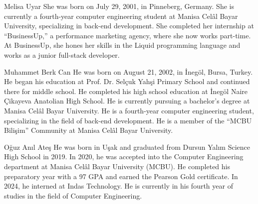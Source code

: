\documentclass[twoside,a4paper,journal]{IEEEtran}
\begin{document}
\begin{IEEEbiography}{Melisa Uyar}
She was born on July 29, 2001, in Pinneberg, Germany.
She is currently a fourth-year computer engineering student at Manisa Celâl
Bayar University, specializing in back-end development.
She completed her internship at ``BusinessUp,'' a performance marketing agency,
where she now works part-time.
At BusinessUp, she hones her skills in the Liquid programming language and
works as a junior full-stack developer.
\end{IEEEbiography}

\begin{IEEEbiography}{Muhammet Berk Can}
He was born on August 21, 2002, in İnegöl, Bursa, Turkey.
He began his education at Prof. Dr. Selçuk Yahşi Primary School and continued
there for middle school.
He completed his high school education at İnegöl Naire Çikayeva Anatolian High
School.
He is currently pursuing a bachelor's degree at Manisa Celâl Bayar University.
He is a fourth-year computer engineering student, specializing in the field of
back-end development.
He is a member of the ``MCBU Bilişim'' Community at Manisa Celâl Bayar University.
\end{IEEEbiography}

\begin{IEEEbiography}{Oğuz Anıl Ateş}
He was born in Uşak and graduated from Dursun Yalım Science High School in 2019.
In 2020, he was accepted into the Computer Engineering department at Manisa
Celâl Bayar University (MCBU).
He completed his preparatory year with a 97 GPA and earned the Pearson Gold
certificate.
In 2024, he interned at Indas Technology.
He is currently in his fourth year of studies in the field of Computer
Engineering.
\end{IEEEbiography}
\end{document}
